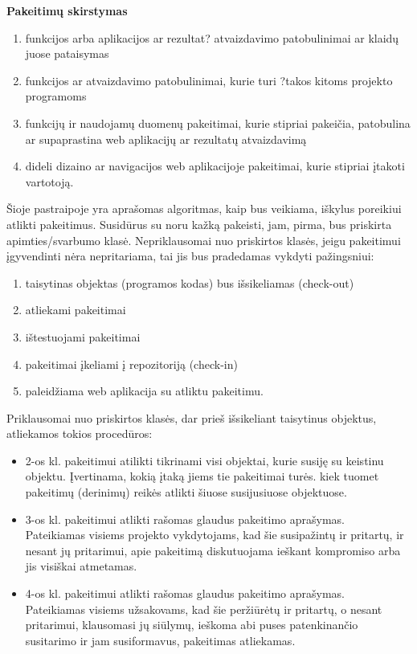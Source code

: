 \documentclass[a4paper,12pt]{article}
\begin{document}
\large\textbf{Pakeitimų skirstymas}
\begin{enumerate}
	\item funkcijos arba aplikacijos ar rezultat? atvaizdavimo patobulinimai ar klaid\k u juose pataisymas
	\item funkcijos ar atvaizdavimo patobulinimai, kurie turi ?takos kitoms projekto programoms
	\item funkcij\k u ir naudojam\k u duomen\k u pakeitimai, kurie stipriai pakei\v cia, patobulina ar supaprastina web aplikacij\k u ar rezultat\k u atvaizdavim\k a
	\item dideli dizaino ar navigacijos web aplikacijoje pakeitimai, kurie stipriai \k itakoti vartotoj\k a.
\end{enumerate}

Šioje pastraipoje yra aprašomas algoritmas, kaip bus veikiama, iškylus poreikiui atlikti pakeitimus. 
Susidūrus su noru kažką pakeisti, jam, pirma, bus priskirta apimties/svarbumo klasė. Nepriklausomai nuo priskirtos klasės, jeigu pakeitimui įgyvendinti nėra nepritariama, tai jis bus pradedamas vykdyti pažingsniui: 
\begin{enumerate}
	\item taisytinas objektas (programos kodas) bus išsikeliamas
 (check-out)
 	\item atliekami pakeitimai
 	\item ištestuojami pakeitimai
 	\item pakeitimai įkeliami į repozitoriją (check-in)
 	\item paleidžiama web aplikacija su atliktu pakeitimu.
\end{enumerate}
\clearpage
Priklausomai nuo priskirtos klasės, dar prieš išsikeliant taisytinus objektus, atliekamos tokios procedūros: 
\begin{itemize}
	\item 2-os kl. pakeitimui atilikti tikrinami visi objektai, kurie susiję su keistinu objektu.
		Įvertinama, kokią įtaką jiems tie pakeitimai turės. kiek tuomet pakeitimų (derinimų) reikės atlikti šiuose susijusiuose objektuose.		
	\item 3-os kl. pakeitimui atlikti rašomas glaudus pakeitimo aprašymas.\\
	Pateikiamas visiems projekto vykdytojams, kad šie susipažintų ir pritartų, ir nesant jų pritarimui, apie pakeitimą diskutuojama ieškant kompromiso arba jis visiškai atmetamas.
	\item 4-os kl. pakeitimui atlikti rašomas glaudus pakeitimo aprašymas.\\
	Pateikiamas visiems užsakovams, kad šie peržiūrėtų ir pritartų, o nesant pritarimui, klausomasi jų siūlymų, ieškoma abi puses patenkinančio susitarimo ir jam susiformavus, pakeitimas atliekamas. 
\end{itemize}
 
\end{document}
